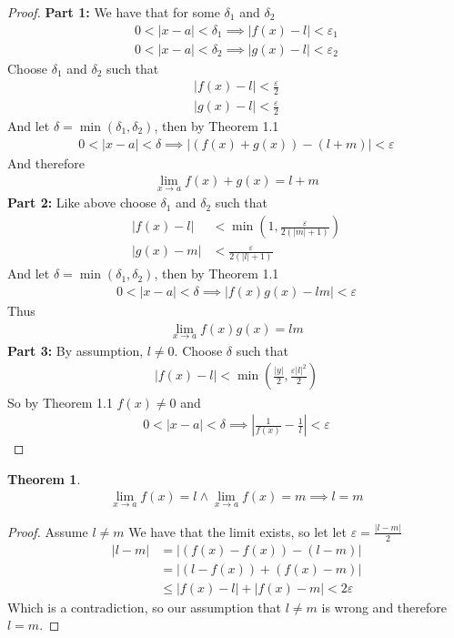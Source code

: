 \documentclass{article}
\newtheorem{theorem}{Theorem}[section]
\begin{document}
\begin{proof}
\textbf{Part 1:} We have that for some $\delta_1$ and $\delta_2$ 
\begin{align*}
    0<|x-a|<\delta_1 \implies |f(x)-l| < \varepsilon_1 \\
    0<|x-a|<\delta_2 \implies |g(x)-l| < \varepsilon_2
\end{align*}
Choose $\delta_1$ and $\delta_2$ such that
\begin{align*}
    |f(x)-l| < \frac{\varepsilon}{2} \\
    |g(x)-l| < \frac{\varepsilon}{2}
\end{align*}
And let $\delta = \min(\delta_1, \delta_2)$, then by Theorem 1.1
\begin{align*}
    0 <|x-a| < \delta \implies |(f(x)+g(x))-(l+m)|< \varepsilon
\end{align*}
And therefore
\begin{align*}
    \lim_{x \rightarrow a} f(x) + g(x) = l + m
\end{align*}
\textbf{Part 2:} Like above choose $\delta_1$ and $\delta_2$ such that
\begin{align*}
    |f(x)-l| &< \min \left(1, \frac{\varepsilon}{2(|m|+1)} \right) \\
    |g(x)-m| &< \frac{\varepsilon}{2(|l|+1)}
\end{align*}
And let $\delta = \min(\delta_1, \delta_2)$, then by Theorem 1.1
\begin{align*}
    0 <|x-a| < \delta \implies |f(x)g(x)-lm|< \varepsilon
\end{align*}
Thus
\begin{align*}
    \lim_{x \rightarrow a} f(x) g(x) = l m
\end{align*}
\textbf{Part 3:} By assumption, $l \neq 0$. Choose $\delta$ such that
\begin{align*}
    |f(x)-l| < \min \left( \frac{|y|}{2}, \frac{\varepsilon|l|^2}{2}\right)
\end{align*}
So by Theorem 1.1 $f(x) \neq 0$ and 
\begin{align*}
    0<|x-a|<\delta \implies \left|\frac{1}{f(x)}-\frac{1}{l}\right| < \varepsilon
\end{align*}
\end{proof}
\begin{theorem}
\begin{align*}
    \lim_{x \rightarrow a} f(x) = l \land \lim_{x \rightarrow a} f(x) = m
    \implies l = m
\end{align*}
\end{theorem}
\begin{proof}
Assume $l \neq m$ We have that the limit exists, so let let $\varepsilon
= \frac{|l-m|}{2}$
\begin{align*}
    |l-m| &= |(f(x)-f(x))-(l-m)| \\
          &= |(l-f(x))+(f(x)-m)| \\
          &\leq |f(x)-l|+|f(x)-m|
          < 2\varepsilon
\end{align*}
Which is a contradiction, so our assumption that $l \neq m$ is wrong
and therefore $l = m$.
\end{proof}
\end{document}
